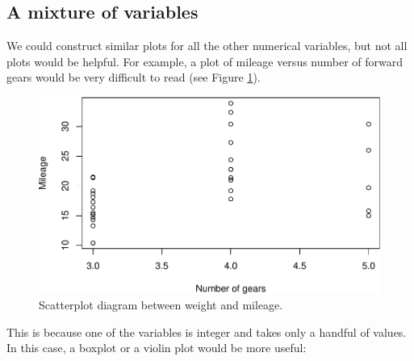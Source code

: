 \documentclass[
]{book}
\newenvironment{Shaded}{\begin{snugshade}}{\end{snugshade}}
\newcommand{\DataTypeTok}[1]{\textcolor[rgb]{0.13,0.29,0.53}{#1}}
\newcommand{\DecValTok}[1]{\textcolor[rgb]{0.00,0.00,0.81}{#1}}
\newcommand{\KeywordTok}[1]{\textcolor[rgb]{0.13,0.29,0.53}{\textbf{#1}}}
\newcommand{\NormalTok}[1]{#1}
\newcommand{\OperatorTok}[1]{\textcolor[rgb]{0.81,0.36,0.00}{\textbf{#1}}}
\newcommand{\StringTok}[1]{\textcolor[rgb]{0.31,0.60,0.02}{#1}}
\theoremstyle{definition}
\theoremstyle{definition}
\theoremstyle{definition}
\theoremstyle{definition}
\theoremstyle{remark}
\begin{document}
\hypertarget{a-mixture-of-variables}{%
\subsection{A mixture of variables}\label{a-mixture-of-variables}}

We could construct similar plots for all the other numerical variables, but not all plots would be helpful. For example, a plot of mileage versus number of forward gears would be very difficult to read (see Figure \ref{fig:scatterGearMPG}).

\begin{Shaded}
\end{Shaded}

\begin{figure}
\centering
\includegraphics{Svetunkov---Statistics-for-Business-Analytics_files/figure-latex/scatterGearMPG-1.pdf}
\caption{\label{fig:scatterGearMPG}Scatterplot diagram between weight and mileage.}
\end{figure}

This is because one of the variables is integer and takes only a handful of values. In this case, a boxplot or a violin plot would be more useful:

\begin{Shaded}
\end{Shaded}
\end{document}
